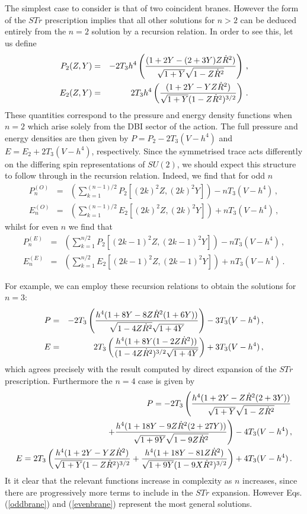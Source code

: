 The simplest case to consider is that of two coincident branes. However
the form of the $STr$ prescription implies that all other solutions for 
$n>2$ can be deduced entirely from the $n=2$ solution by a recursion relation. 
In order to see this, let us define 
\begin{eqnarray}
\label{2brane}
P_2(Z,Y) &=& - 2 T_3 h^4 \left(\frac{(1+2Y -
(2+3Y)Z\dot{R}^2)}{\sqrt{1+Y}\sqrt{1-Z\dot{R}^2}}\right) \,, \nonumber \\
E_2(Z,Y) &=& 2 T_3 h^4 \left(\frac{(1+2Y -
YZ\dot{R}^2)}{\sqrt{1+Y}(1-Z\dot{R}^2)^{3/2}}\right) \,.
\end{eqnarray}
These quantities correspond to the pressure and energy density functions 
when $n=2$ which arise solely from the DBI sector of the action.
The full pressure and energy densities are then 
given by $P = P_2 - 2T_3(V-h^4)$ and
$E = E_2 + 2T_3 (V-h^4)$, respectively.
Since the symmetrised trace acts differently on the differing spin
representations of $SU(2)$, we should expect this structure to follow
through in the recursion relation. Indeed, we find that for odd $n$
\begin{eqnarray}
\label{oddbrane}
P_n^{(O)} &=& \left(\sum_{k=1}^{(n-1)/2} P_2[(2k)^2Z, (2k)^2Y]
\right)-nT_3(V-h^4) \,, \nonumber \\
E_n^{(O)} &=& \left(\sum_{k=1}^{(n-1)/2} E_2[(2k)^2Z, (2k)^2Y] \right)+
nT_3(V-h^4) \,,
\end{eqnarray}
whilst for even $n$ we find that 
\begin{eqnarray}
\label{evenbrane}
P_n^{(E)} &=& \left(\sum_{k=1}^{n/2} P_2[(2k-1)^2Z, (2k-1)^2Y]
\right)-nT_3(V-h^4) \,, \nonumber \\
E_n^{(E)} &=& \left(\sum_{k=1}^{n/2} E_2[(2k-1)^2Z, (2k-1)^2Y] \right)+
nT_3(V-h^4) \,.
\end{eqnarray}

For example, we can employ these recursion relations to obtain the 
solutions for $n=3$:  
\begin{eqnarray}
P &=& - 2T_3 \left(\frac{h^4
(1+8Y-8Z\dot{R}^2(1+6Y))}{\sqrt{1-4Z\dot{R}^2}\sqrt{1+4Y}}\right)
 -3T_3(V-h^4) \,, \nonumber \\
E &=&  2T_3 \left(\frac{h^4
(1+8Y(1-2Z\dot{R}^2))}{(1-4Z\dot{R}^2)^{3/2}\sqrt{1+4Y}}\right) +3T_3(V-h^4) \,,
\end{eqnarray}
which agrees precisely with the result computed by direct 
expansion of the $STr$ prescription. Furthermore the $n=4$ case is given by 
\begin{eqnarray}
P = -2T_3\left(\frac{h^4
(1+2Y-Z\dot{R}^2(2+3Y))}{\sqrt{1+Y}\sqrt{1-Z\dot{R}^2}} \right. 
\nonumber \\
\left. +\frac{h^4(1+18Y-9Z\dot{R}^2(2+27Y))}
{\sqrt{1+9Y}\sqrt{1-9Z\dot{R}^2}}\right) 
 -4T_3(V-h^4) \,, \nonumber \\
E =  2T_3 \left(\frac{h^4(1+2Y-YZ\dot{R}^2)}{\sqrt{1+Y}(1-Z\dot{R}^2)^{3/2}} +
\frac{h^4(1+18Y-81Z\dot{R}^2)}{\sqrt{1+9Y}(1-9X\dot{R}^2)^{3/2}} \right)
+4T_3(V-h^4) \, .
\end{eqnarray}
It it clear that the relevant functions increase in complexity as 
$n$ increases, since there are progressively more
terms to include in the $STr$ expansion. However Eqs. (\ref{oddbrane}) and (\ref{evenbrane})
represent the most general
solutions. 

